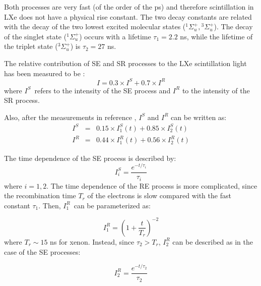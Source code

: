 \documentclass[11pt,a4paper]{article}
\begin{document}
Both processes are very fast (of the order of the ps) and therefore scintillation in LXe does not have a physical rise constant. The two decay constants are related with the decay of the two lowest excited molecular states 
(${}^1{\Sigma_u^+},{}^3{\Sigma_u^+}$). The decay of the singlet state 
(${}^1{\Sigma_u^+}$) occurs with a lifetime $\tau_1 =2.2$ ns, while the lifetime of the triplet state (${}^3{\Sigma_u^+}$) is $\tau_2 =27$ ns.

The relative contribution of SE and SR processes to the LXe scintillation light has been measured to be \cite{Kubota79}:
\begin{equation}
I = 0.3\times I^S + 0.7\times I^R
\label{eq.tot}
\end{equation}
%
where $I^S$~refers to the intensity of the SE process and $I^R$ to the intensity of the SR process.

Also, after the measurements in reference \cite{Kubota79}, $I^S$ and $I^R$ can be written as:
\begin{eqnarray}
I^S & = & 0.15\times I_1^S(t) +  0.85\times I_2^S(t) \\
 I^R & = & 0.44\times I_1^R(t) +  0.56\times I_2^R(t)
\end{eqnarray}

The time dependence of the SE process is described by:
\begin{equation}
I^S_i = \frac{e^{-t/\tau_i}}{\tau_i}
\end{equation}
%
where $i=1,2$. The time dependence of the RE process is more complicated, since the recombination time $T_r$
of the electrons is slow compared with the fast constant $\tau_1$. Then, $I^R_1$~can be parameterized \cite{Kubota79} as: 

\begin{equation}
I^R_1 =(1 + \frac{t}{T_r})^{-2}
\end{equation}
%
where $T_r \sim 15$ ns for xenon. Instead, since $\tau_2 > T_r$, $I^R_2$ can be described as in the case of the SE processes: 

\begin{equation}
I^R_2 =\frac{e^{-t/\tau_2}}{\tau_2}
\end{equation}
\end{document}
